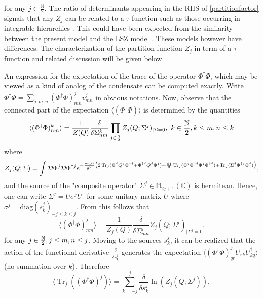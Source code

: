 \documentclass[a4paper,11pt,twoside]{article}
\numberwithin{equation}{section}
\DeclareMathOperator{\tr}{Tr}
\theoremstyle{nonumberplain}
\newcounter{and}
\begin{document}
%
for any $j\in\frac{\mathbb{N}}{2}$. The ratio of determinants appearing in the RHS of \eqref{partitionfactor} signals that any $Z_j$ can be related to a $\tau$-function such as those occurring in integrable hierarchies \cite{integ1-rev}. This could have been expected from the similarity between the present model and the LSZ model \cite{LSZ}. These models however have differences. The characterization of the partition function $Z_j$ in term of a $\tau$-function and related discussion will be given below.\par%
%
An expression for the expectation of the trace of the operator $\Phi^\dag\Phi$, which may be viewed as a kind of analog of the condensate can be computed exactly. Write $\Phi^\dag\Phi=\sum_{j,m,n}(\Phi^\dag\Phi)^j_{mn}v^j_{mn}$ in obvious notations. Now, observe that the connected part of the expectation $\langle(\Phi^\dag\Phi) \rangle$ is determined by the quantities%
%
\begin{equation}
\langle(\Phi^\dag\Phi)^k_{nm} \rangle=\frac{1}{Z(Q)}\frac{\delta}{\delta\Sigma^k_{nm}}\prod_{j\in\frac{\mathbb{N}}{2}}Z_j(Q;\Sigma^j)_{\vert\Sigma=0 },\ k\in\frac{\mathbb{N}}{2}, \-k\le m,n\le k
\end{equation}
%
where%
%
\begin{equation}
Z_j(Q;\Sigma)=\int{\cal{D}}\Phi^j{\cal{D}}\Phi^{\dag j}e^{-\frac{w(j)}{g^2}\big(2\tr_j(\Phi^j Q^j\Phi^{\dag j}+\Phi^{\dag j} Q^j\Phi^j)+\frac{64}{3}\tr_j(\Phi^j\Phi^{\dag j}\Phi^j\Phi^{\dag j})+\tr_j(\Sigma^j\Phi^{\dag j}\Phi^j) \big)}\label{condensat-generating},
\end{equation}
%
and the source of the "composite operator" $\Sigma^j\in\mathbb{M}_{2j+1}(\mathbb{C})$ is hermitean. Hence, one can write $\Sigma^j=U\sigma^jU^\dag$ for some unitary matrix $U$ where $\sigma^j=\text{diag}(s^j_k)_{-j\le k\le j}$. From this follows that
%
\begin{equation}
\langle(\Phi^\dag\Phi)^j_{nm} \rangle=\frac{1}{Z_j(Q)}\frac{\delta}{\delta\Sigma^j_{mn}}Z_j(Q;\Sigma^j)_{\vert\Sigma^j=0}\label{condensat-component}.
\end{equation}
%
for any $j\in\frac{\mathbb{N}}{2}, \-j\le m,n\le j$. Moving to the sources $s^j_k$, it can be realized that the action of the functional derivative $\frac{\delta}{\delta s^j_k}$ generates the expectation $\langle (\Phi^\dag\Phi)^j_{qr}U_{rk}U^\dag_{kq}\rangle$ (no summation over $k$). Therefore%
%
\begin{equation}
\langle \tr_j((\Phi^\dag\Phi)^j)\rangle=\sum_{k=-j}^j\frac{\delta}{\delta s^j_k}\ln(Z_j(Q;\Sigma^j)),
\end{equation}
\end{document}
